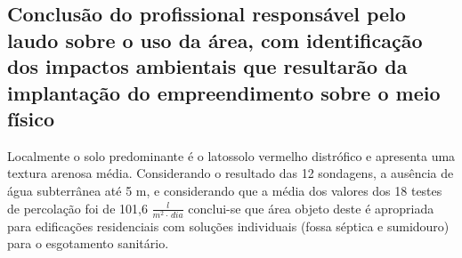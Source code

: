 \subsection{Conclusão do profissional responsável pelo laudo sobre o uso da área, com identificação dos impactos ambientais que resultarão da implantação do empreendimento sobre o meio físico}
%
%
%
%
%
%
%


Localmente o solo predominante é o latossolo vermelho distrófico e apresenta uma textura arenosa média.
Considerando o resultado das 12 sondagens, a ausência de água
subterrânea até 5 m,
e considerando que
a média dos valores dos 18 testes de percolação foi de 101,6 $\frac{l}{m^2\cdot\,dia}$  
conclui-se que
área objeto deste é apropriada para edificações residenciais  com soluções individuais
(fossa séptica e sumidouro) para o esgotamento sanitário.